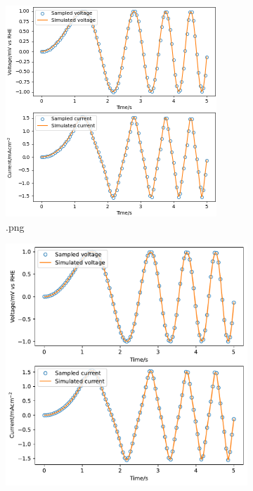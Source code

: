     \begin{figure}
        \begin{subfigure}[t]{0.45\textwidth}
        \includegraphics[width=\linewidth]{./figs/example_1.png}
        \caption{.png}
        \label{figures:fig:exmaple:2:png}
        \end{subfigure}
        \begin{subfigure}[t]{0.45\textwidth}
        \includegraphics[width=\linewidth]{./figs/example_1.pdf}

\end{subfigure}
\end{figure}
